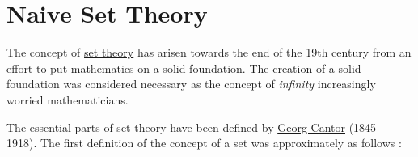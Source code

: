 \chapter{Naive Set Theory}
The concept of \href{https://en.wikipedia.org/wiki/set_theory}{set theory} has arisen towards the end of the 19th century
from an effort to put mathematics on a solid foundation.  The creation of a solid foundation was considered necessary as
the concept of \emph{infinity} increasingly worried mathematicians. 

The essential parts of set theory have been defined by \href{https://de.wikipedia.org/wiki/Georg_Cantor}{Georg
  Cantor}  (1845 -- 1918). The first definition of the concept of a set was approximately as follows
\cite{cantor:1895}: 

\begin{center}
\colorbox{red}{}
\end{center}
\vspace*{0.2cm}

